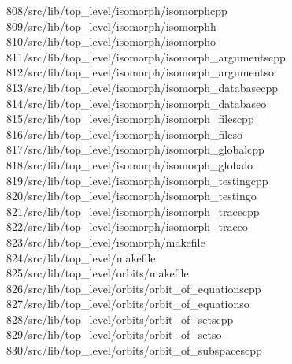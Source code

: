 \begin{tabbing}
808\>/src/lib/top\_level/isomorph/isomorphcpp\\[0pt]
809\>/src/lib/top\_level/isomorph/isomorphh\\[0pt]
810\>/src/lib/top\_level/isomorph/isomorpho\\[0pt]
811\>/src/lib/top\_level/isomorph/isomorph\_argumentscpp\\[0pt]
812\>/src/lib/top\_level/isomorph/isomorph\_argumentso\\[0pt]
813\>/src/lib/top\_level/isomorph/isomorph\_databasecpp\\[0pt]
814\>/src/lib/top\_level/isomorph/isomorph\_databaseo\\[0pt]
815\>/src/lib/top\_level/isomorph/isomorph\_filescpp\\[0pt]
816\>/src/lib/top\_level/isomorph/isomorph\_fileso\\[0pt]
817\>/src/lib/top\_level/isomorph/isomorph\_globalcpp\\[0pt]
818\>/src/lib/top\_level/isomorph/isomorph\_globalo\\[0pt]
819\>/src/lib/top\_level/isomorph/isomorph\_testingcpp\\[0pt]
820\>/src/lib/top\_level/isomorph/isomorph\_testingo\\[0pt]
821\>/src/lib/top\_level/isomorph/isomorph\_tracecpp\\[0pt]
822\>/src/lib/top\_level/isomorph/isomorph\_traceo\\[0pt]
823\>/src/lib/top\_level/isomorph/makefile\\[0pt]
824\>/src/lib/top\_level/makefile\\[0pt]
825\>/src/lib/top\_level/orbits/makefile\\[0pt]
826\>/src/lib/top\_level/orbits/orbit\_of\_equationscpp\\[0pt]
827\>/src/lib/top\_level/orbits/orbit\_of\_equationso\\[0pt]
828\>/src/lib/top\_level/orbits/orbit\_of\_setscpp\\[0pt]
829\>/src/lib/top\_level/orbits/orbit\_of\_setso\\[0pt]
830\>/src/lib/top\_level/orbits/orbit\_of\_subspacescpp\\[0pt]

\end{tabbing}
